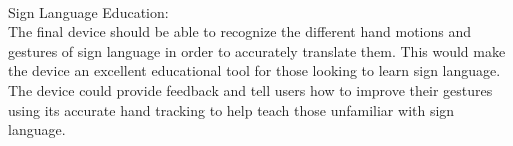 \documentclass{article}
\begin{document}
~\\Sign Language Education:\\
The final device should be able to recognize the different hand motions and gestures of sign language in order to accurately 
translate them. This would make the device an excellent educational tool for those looking to learn sign language. The device could 
provide feedback and tell users how to improve their gestures using it\textquotesingle s accurate hand tracking to help teach those unfamiliar with 
sign language.
\end{document}
